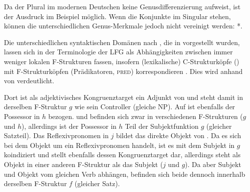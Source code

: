 Da der Plural im modernen Deutschen keine Genusdifferenzierung aufweist, ist
der Ausdruck im Beispiel möglich. Wenn die Konjunkte im Singular stehen, können
die unterschiedlichen Genus-Merkmale jedoch nicht vereinigt werden:
*.

Die unterschiedlichen syntaktischen Domänen nach \citet[54]{corbett2006}, die
in  vorgestellt wurden, lassen sich in der Terminologie der
LFG als Abhängigkeiten zwischen immer weniger lokalen F-Strukturen fassen,
insofern (lexikalische) C-Strukturköpfe () mit F-Strukturköpfen
(Prädikatoren, \textsc{pred}) korrespondieren \autocite[117]{bresnanetal2016}.
Dies wird anhand von  verdeutlicht.

Dort ist  als adjektivisches Kongruenztarget ein Adjunkt von
 und steht damit in derselben F-Struktur $g$ wie sein Controller
(gleiche NP). Auf  ist ebenfalls der Possessor  in $h$
bezogen.  und  befinden sich zwar in verschiedenen
F-Strukturen ($g$ und $h$), allerdings ist der Possessor in $h$ Teil der
Subjektfunktion $g$ (gleicher Satzteil). Das Reflexivpronomen  in $j$
bildet das direkte Objekt von . Da es sich bei dem Objekt um ein
Reflexivpronomen handelt, ist es mit dem Subjekt in $g$ koindiziert und stellt
ebenfalls dessen Kongruenztarget dar, allerdings steht  als Objekt in
einer anderen F-Struktur als das Subjekt ($j$ und $g$). Da aber Subjekt und
Objekt vom gleichen Verb  abhängen, befinden sich beide dennoch
innerhalb derselben F-Struktur $f$ (gleicher Satz).

